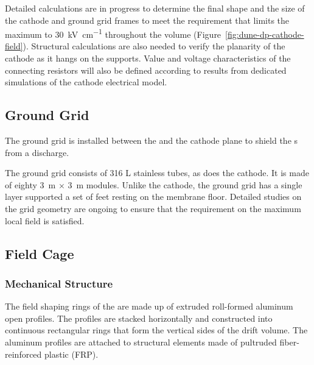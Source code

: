 Detailed calculations are in progress to determine the final shape and the size of the cathode and ground grid frames to meet the requirement that limits the maximum \efield to \SI{30}{\kV\per\cm}  
throughout the \lar volume (Figure~\ref{fig:dune-dp-cathode-field}).  Structural calculations are also needed to verify the planarity of the cathode as it hangs on the \fc supports.
Value and voltage characteristics of the connecting resistors will also be defined according to results from dedicated simulations of the cathode electrical model.


\subsection{Ground Grid}
The ground grid is installed between the  and the cathode plane to shield the \pmt{}s from a discharge.  

The ground grid consists of 316 L stainless tubes, as does the cathode. It is made of eighty \SI{3}{\m} $\times$ \SI{3}{\m} modules. Unlike the cathode, the ground grid has a single layer supported a set of feet resting on the membrane floor.
Detailed studies on the grid geometry are ongoing to ensure that the requirement on the maximum local field is satisfied.

\subsection{Field Cage}

\subsubsection{Mechanical Structure}
The field shaping rings of the \fc are made up of extruded roll-formed aluminum open profiles.  
The profiles are stacked horizontally and constructed into continuous rectangular rings that form the vertical sides of the drift volume. The aluminum profiles are attached to structural elements made of pultruded fiber-reinforced plastic (FRP). 


